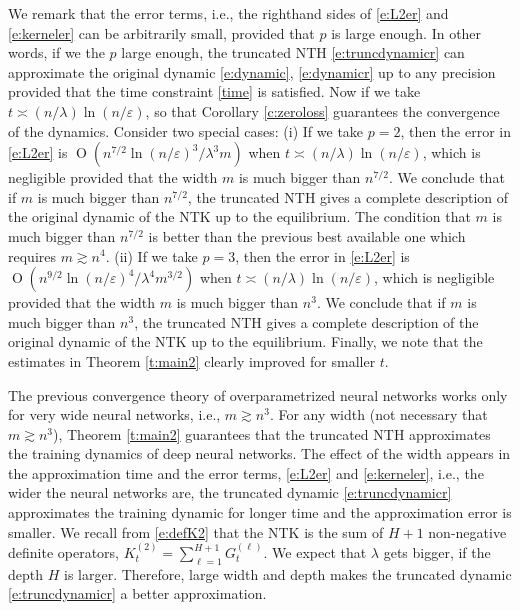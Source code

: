 \documentclass{article}
\numberwithin{equation}{section}
\newcommand{\la}{\lambda}
\DeclareMathOperator{\OO}{O}
\newcommand{\cor}{\color{darkred}}
\newcommand{\cob}{\color{darkblue}}
\newcommand{\nc}{\normalcolor}
\newcommand{\1}{\mathds{1}}
\theoremstyle{plain} %
\begin{document}
We remark that the error terms, i.e., the righthand sides of \eqref{e:L2er} and \eqref{e:kerneler} can be arbitrarily small, provided that $p$ is large enough. In other words, if we the $p$ large enough, the truncated NTH \eqref{e:truncdynamicr} can approximate the original dynamic \eqref{e:dynamic}, \eqref{e:dynamicr} up to any precision provided that the time 
constraint \eqref{time} is satisfied.
 Now if we take $t\asymp (n/\la)\ln(n/\varepsilon)$,
so that Corollary \ref{c:zeroloss} guarantees the convergence of the dynamics. Consider two special cases: 
{(i)} If we take $p=2$, then the error in \eqref{e:L2er} is $\OO(n^{7/2}\ln(n/\varepsilon)^3/\la^3m)$ when $t\asymp (n/\la)\ln(n/\varepsilon)$, which is negligible provided that the width $m$ is much bigger than $n^{7/2}$. We conclude that if $m$ is much bigger than $n^{7/2}$, the truncated NTH gives a complete description of the original dynamic of the NTK up to the equilibrium. The condition  that $m$ is much bigger than $n^{7/2}$ is better than the previous best available one which requires $m\gtrsim n^4$. %
{(ii)} If we take $p=3$, then the error in \eqref{e:L2er} is $\OO(n^{9/2}\ln(n/\varepsilon)^4/\la^4 m^{3/2})$  when $t\asymp (n/\la)\ln(n/\varepsilon)$, which is negligible provided that the width $m$ is much bigger than $n^{3}$. We conclude that if $m$ is much bigger than $n^{3}$,  the truncated NTH gives a complete description of the original dynamic of the NTK up to the equilibrium. Finally, we note that the estimates in Theorem \ref{t:main2} clearly improved for smaller $t$. 




The previous convergence theory of overparametrized neural networks works only for very  wide neural networks, i.e., $m\gtrsim n^3$. %
For any width (not necessary that $m\gtrsim n^3$), Theorem \ref{t:main2} guarantees that the truncated NTH approximates the training dynamics of deep neural networks.
The effect of the width appears in the approximation time and the error terms,  \eqref{e:L2er} and \eqref{e:kerneler}, i.e., the wider the neural networks are, the truncated dynamic \eqref{e:truncdynamicr} approximates the training dynamic for longer time and the approximation error is smaller. We recall from \eqref{e:defK2} that the NTK is the sum of $H+1$ non-negative definite operators, $K_t^{(2)}=\sum_{\ell=1}^{H+1}G_t^{(\ell)}$. We expect that $\la$ gets bigger, if the depth $H$ is larger. Therefore, large width and depth
makes the  truncated dynamic \eqref{e:truncdynamicr} a better approximation.
\end{document}

